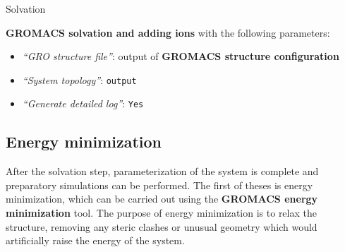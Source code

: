 \documentclass[twocolumn]{bmcart}%
\providecommand{\tightlist}{%
  \setlength{\itemsep}{0pt}\setlength{\parskip}{0pt}}
\begin{document}
\begin{handson_box_colour}{Solvation}


  \textbf{GROMACS solvation and adding ions} with the following
  parameters:
  \begin{itemize}
  \tightlist
  \item
    \emph{``GRO structure file''}: output of
    \textbf{GROMACS structure configuration}
  \item
    \emph{``System topology''}: \texttt{output}
  \item
    \emph{``Generate detailed log''}: \texttt{Yes}
  \end{itemize}

\end{handson_box_colour}

\subsection*{Energy minimization}\label{energy-minimization}

After the solvation step, parameterization of the system is complete and preparatory simulations can be performed. The first of theses is energy minimization, which can be carried out using the
\textbf{GROMACS energy minimization} tool. The purpose of energy minimization is to relax the structure, removing any steric clashes or unusual geometry which would artificially raise the energy of the system.
\end{document}
